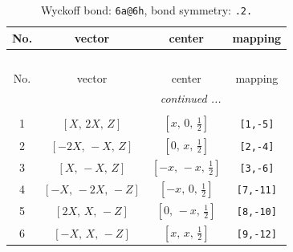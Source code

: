 \documentclass[fleqn,8pt]{jsarticle}
\begin{document}
\begin{longtable}{cccc}
\caption{Wyckoff bond: {\tt 6a@6h}, bond symmetry: {\tt .2.}}
 \\
 \hline \hline
No. & vector & center & mapping \\ \hline \endfirsthead

\multicolumn{3}{l}{\tablename\ \thetable{}} \\
 \hline \hline
No. & vector & center & mapping \\ \hline \endhead

 \hline \hline
\multicolumn{3}{r}{\footnotesize\it continued ...} \\ \endfoot

 \hline \hline
\multicolumn{3}{r}{} \\ \endlastfoot

1 & $\left[ X,\, 2 X,\, Z \right]$ & $\left[ x,\, 0,\, \frac{1}{2} \right]$ & {\tt [1,-5]} \\ \hline
2 & $\left[ - 2 X,\, - X,\, Z \right]$ & $\left[ 0,\, x,\, \frac{1}{2} \right]$ & {\tt [2,-4]} \\ \hline
3 & $\left[ X,\, - X,\, Z \right]$ & $\left[ - x,\, - x,\, \frac{1}{2} \right]$ & {\tt [3,-6]} \\ \hline
4 & $\left[ - X,\, - 2 X,\, - Z \right]$ & $\left[ - x,\, 0,\, \frac{1}{2} \right]$ & {\tt [7,-11]} \\ \hline
5 & $\left[ 2 X,\, X,\, - Z \right]$ & $\left[ 0,\, - x,\, \frac{1}{2} \right]$ & {\tt [8,-10]} \\ \hline
6 & $\left[ - X,\, X,\, - Z \right]$ & $\left[ x,\, x,\, \frac{1}{2} \right]$ & {\tt [9,-12]} \\
\end{longtable}
\renewcommand{\arraystretch}{1.2}
\end{document}
